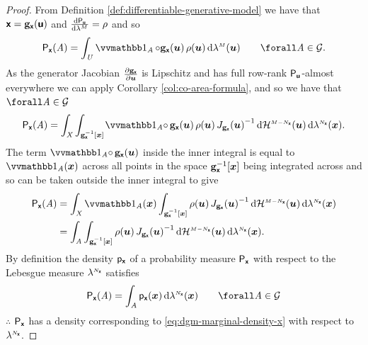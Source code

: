 \begin{proof}
From Definition \ref{def:differentiable-generative-model} we have that $\boldsymbol{\mathsf{x}} = {\mathbf{g}}_{\boldsymbol{\mathsf{x}}}(\boldsymbol{\mathsf{u}})$ and $\td{\prob{\rvct{u}}}{\lebm{M}} = \rho$ and so
\begin{equation*}
  \prob{\rvct{x}}(\set{A}) 
  =
  \int_{\set{U}} 
    \ind{\set{A}}\circ\genfunc_{\rvct{x}}(\vct{u})\,\rho(\vct{u})
  \,\dr\lebm{M}(\vct{u})
  \qquad \forall \set{A} \in\sset{G}.
\end{equation*}
As the generator Jacobian $\frac{\partial {\mathbf{g}}_{\boldsymbol{\mathsf{x}}}}{\partial \boldsymbol{u}}$ is Lipschitz and has full row-rank $\mathsf{P}_{\boldsymbol{\mathsf{u}}}$-almost everywhere we can apply Corollary \ref{col:co-area-formula}, and so we have that $\forall \set{A} \in\sset{G}$
\begin{equation*}
  \prob{\rvct{x}}(\set{A}) =
  \int_{\set{X}}
  \int_{\preimage{\genfunc_{\rvct{x}}}{\vct{x}}}\kern-1pt
    \ind{\set{A}}\!\circ\,\genfunc_{\rvct{x}}(\vct{u})\,\rho(\vct{u})\,
    \jacobproddet{\genfunc_{\rvct{x}}}{\vct{u}}^{-1}
  \,\dr\haum{M-{N_{\rvct{x}}}}(\vct{u})
  \,\dr\lebm{N_{\rvct{x}}}(\vct{x}).
\end{equation*}
The term $\ind{\set{A}}\!\circ\,\genfunc_{\rvct{x}}(\vct{u})$ inside the inner integral is equal to $\ind{\set{A}}(\vct{x})$ across all points in the space ${\mathbf{g}}_{\boldsymbol{\mathsf{x}}}^{-1}[\boldsymbol{x}]$ being integrated across and so can be taken outside the inner integral to give
\begin{align*}
  \prob{\rvct{x}}(\set{A})
  &=
  \int_{\set{X}}
  \ind{\set{A}}(\vct{x})
  \int_{\preimage{\genfunc_{\rvct{x}}}{\vct{x}}} 
   \rho(\vct{u})\,
   \jacobproddet{\genfunc_{\rvct{x}}}{\vct{u}}^{-1}
  \,\dr\haum{M-{N_{\rvct{x}}}}(\vct{u})
  \,\dr\lebm{N_{\rvct{x}}}(\vct{x})\\
  &=
  \int_{\set{A}}
  \int_{\preimage{\genfunc_{\rvct{x}}}{\vct{x}}} 
   \rho(\vct{u})\,
   \jacobproddet{\genfunc_{\rvct{x}}}{\vct{u}}^{-1}
  \,\dr\haum{M-{N_{\rvct{x}}}}(\vct{u})
  \,\dr\lebm{N_{\rvct{x}}}(\vct{x}).
\end{align*}
By definition the density $\mathsf{p}_{\boldsymbol{\mathsf{x}}}$ of a probability measure $\mathsf{P}_{\boldsymbol{\mathsf{x}}}$ with respect to the Lebesgue measure $\lebm{N_{\rvct{x}}}$ satisfies
\begin{equation*}
  \prob{\rvct{x}}(\set{A}) = \int_{\set{A}} \pden{\rvct{x}}(\vct{x}) \,\dr\lebm{N_{\rvct{x}}}(\vct{x})
  \qquad \forall \set{A} \in \sset{G}
\end{equation*}
$\therefore$ $\mathsf{P}_{\boldsymbol{\mathsf{x}}}$ has a density corresponding to \eqref{eq:dgm-marginal-density-x} with respect to $\lebm{N_{\rvct{x}}}$. \qedhere
\end{proof}
